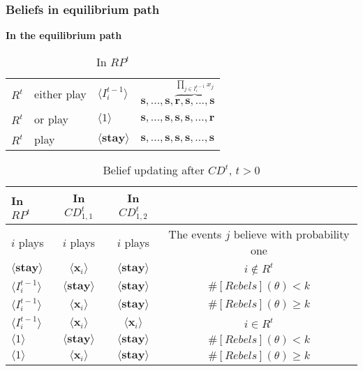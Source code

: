 \documentclass[10pt]{beamer}
\begin{document}
\begin{frame}
\frametitle{Beliefs in equilibrium path}

\textbf{In the equilibrium path}

\begin{table}[h]
\caption{In $RP^t$}
\begin{tabular}{l l l l}
$R^t$ & either play & $\langle I^{t-1}_i\rangle$ & $\textbf{s},...,\textbf{s},\overbrace{\textbf{r},\textbf{s},...,\textbf{s}}^{\prod_{j\in I^{t-1}_i}x_j}$ \\
$R^t$ & or play &  {$\langle 1 \rangle$} & $\textbf{s},...,\textbf{s},\textbf{s},\textbf{s},...,\textbf{r}$  \\
\hline
$R^t$ & play & $\langle \textbf{stay} \rangle$ & $\textbf{s},...,\textbf{s},\textbf{s},\textbf{s},...,\textbf{s}$  \\

\end{tabular}
\end{table}


\begin{table}[ht]
\caption{Belief updating after $CD^t$, $t>0$}
\label{Table_blf_up_cdt12}
\begin{center}
\begin{tabular}{l c c c}
In $RP^t$ 	 	&  	In $CD^t_{1,1}$		&  In $CD^t_{1,2}$	  &\\
\hline
\hline
$i$ plays 		                             &  	$i$ plays		&				$i$ plays			& The events $j$ believe with probability one  \\
\hline
$\langle  \textbf{stay} \rangle$ 	& 	$\langle \mathbf{x}_i \rangle$	&  $\langle \textbf{stay} \rangle$ &  $i\notin R^t$ \\
$\langle  {I^{t-1}_i} \rangle$ 		&  $\langle \textbf{stay} \rangle$	&	$\langle \textbf{stay} \rangle$ &  $\#[Rebels](\theta)< k$   \\
$\langle  {I^{t-1}_i} \rangle$ 		&  $\langle \mathbf{x}_i \rangle$	&	$\langle \textbf{stay} \rangle$ &  $\#[Rebels](\theta)\geq k$    \\
$\langle  {I^{t-1}_i} \rangle$ 		&  $\langle \mathbf{x}_i \rangle$	&	$\langle \mathbf{x}_i \rangle$ &  $i\in R^t$  \\
$\langle 1 \rangle$ 		             &  $\langle \textbf{stay} \rangle$	&	$\langle \textbf{stay} \rangle$ &  $\#[Rebels](\theta)< k$\\
$\langle 1 \rangle$ 		             &  $\langle \mathbf{x}_i \rangle$	&	$\langle \textbf{stay} \rangle$ & $\#[Rebels](\theta)\geq k$
\end{tabular}
\end{center}
\end{table}

 
\end{frame}
\end{document}
